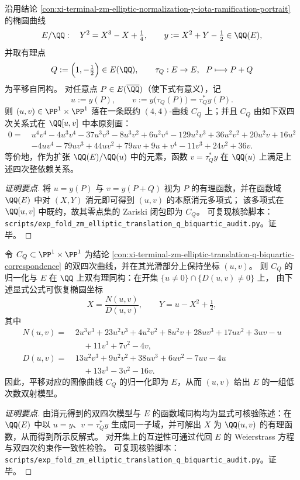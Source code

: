 \begin{conclusion}[有理点平移在重量坐标上的双四次对应]\label{con:xi-terminal-zm-elliptic-translation-q-biquartic-correspondence}
沿用结论 \ref{con:xi-terminal-zm-elliptic-normalization-y-iota-ramification-portrait} 的椭圆曲线
\[
E/\QQ:\quad Y^{2}=X^{3}-X+\tfrac14,
\qquad
y:=X^{2}+Y-\tfrac12\in\QQ(E),
\]
并取有理点
\[
Q:=\Bigl(1,-\tfrac12\Bigr)\in E(\QQ),
\qquad
\tau_{Q}:E\to E,\ \ P\longmapsto P+Q
\]
为平移自同构。
对任意点 \(P\in E(\overline{\QQ})\)（使下式有意义），记
\[
u:=y(P),\qquad v:=y\bigl(\tau_{Q}(P)\bigr)=\tau_Q^{*}y(P).
\]
则 \((u,v)\in\PP^{1}\times\PP^{1}\) 落在一条既约 \((4,4)\)-曲线 \(C_{Q}\) 上；并且 \(C_{Q}\) 由如下双四次关系式在 \(\QQ[u,v]\) 中本原刻画：
\[
\begin{aligned}
0=\ &u^{4}v^{4}-4u^{3}v^{4}-37u^{3}v^{3}-8u^{3}v^{2}+6u^{2}v^{4}-129u^{2}v^{3}+36u^{2}v^{2}+20u^{2}v+16u^{2} \\
&-4uv^{4}-79uv^{3}+44uv^{2}+79uv+9u+v^{4}-11v^{3}+24v^{2}+36v.
\end{aligned}
\]
等价地，作为扩张 \(\QQ(E)/\QQ(u)\) 中的元素，函数 \(v=\tau_Q^*y\) 在 \(\QQ(u)\) 上满足上述四次整依赖关系。
\end{conclusion}
\begin{proof}[证明要点]
将 \(u=y(P)\) 与 \(v=y(P+Q)\) 视为 \(P\) 的有理函数，并在函数域 \(\QQ(E)\) 中对 \((X,Y)\) 消元即可得到 \((u,v)\) 的本原消元多项式；
该多项式在 \(\QQ[u,v]\) 中既约，故其零点集的 Zariski 闭包即为 \(C_Q\)。
可复现核验脚本：\texttt{scripts/exp\_fold\_zm\_elliptic\_translation\_q\_biquartic\_audit.py}。证毕。
\end{proof}

\begin{conclusion}[双四次图像曲线的归一化与椭圆坐标的显式回收]\label{con:xi-terminal-zm-elliptic-translation-q-biquartic-birational-recovery}
令 \(C_Q\subset \PP^{1}\times\PP^{1}\) 为结论 \ref{con:xi-terminal-zm-elliptic-translation-q-biquartic-correspondence} 的双四次曲线，并在其光滑部分上保持坐标 \((u,v)\)。
则 \(C_Q\) 的归一化与 \(E\) 在 \(\QQ\) 上双有理同构：在开集 \(\{u\neq 0\}\cap\{D(u,v)\neq 0\}\) 上，
由下述显式公式可恢复椭圆坐标
\[
X=\frac{N(u,v)}{D(u,v)},
\qquad
Y=u-X^{2}+\tfrac12,
\]
其中
\[
\begin{aligned}
N(u,v)=\ &2u^{3}v^{3}+23u^{2}v^{3}+4u^{2}v^{2}+8u^{2}v+28uv^{3}+17uv^{2}+3uv-u \\
&\quad+11v^{3}+7v^{2}-4v,\\[2mm]
D(u,v)=\ &13u^{2}v^{3}+9u^{2}v^{2}+38uv^{3}+6uv^{2}-7uv-4u \\
&\quad+13v^{3}-3v^{2}-16v.
\end{aligned}
\]
因此，平移对应的图像曲线 \(C_Q\) 的归一化即为 \(E\)，从而 \((u,v)\) 给出 \(E\) 的一组低次数双射模型。
\end{conclusion}
\begin{proof}[证明要点]
由消元得到的双四次模型与 \(E\) 的函数域同构均为显式可核验陈述：在 \(\QQ(E)\) 中以 \(u=y\)、\(v=\tau_Q^*y\) 生成同一子域，并可解出 \(X\) 为 \(\QQ(u,v)\) 的有理函数，从而得到所示反解式。
对开集上的互逆性可通过代回 \(E\) 的 Weierstrass 方程与双四次约束作一致性检验。
可复现核验脚本：\texttt{scripts/exp\_fold\_zm\_elliptic\_translation\_q\_biquartic\_audit.py}。证毕。
\end{proof}

